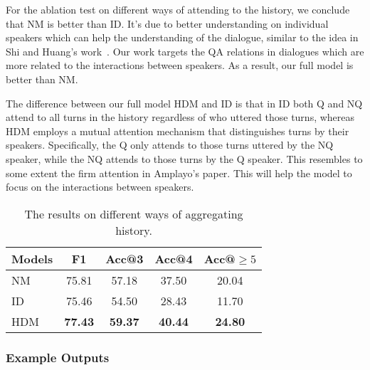 For the ablation test on different ways of attending to the history, we conclude that
NM is better than ID. It's due to better understanding on individual speakers which can
help the understanding of the dialogue, similar to the idea in Shi and Huang's work~\cite{ShiH19}.
Our work targets the QA relations in dialogues which are more related to the interactions 
between speakers. As a result, our full model is better than NM. 

The difference between our full model HDM and ID is that in ID both Q and NQ attend to
all turns in the history regardless of who uttered those turns, whereas HDM employs a
mutual attention mechanism that distinguishes turns by their speakers. Specifically, the
Q only attends to those turns uttered by the NQ speaker, while the NQ attends to those
turns by the Q speaker. This resembles to some extent the firm attention in Amplayo's paper\cite{amplayo2018entity}.
This will help the model to focus on the interactions between speakers. 



\begin{table}

	\centering
	\begin{tabular}{p{1.5cm}<{\centering}|c|ccc}
	\toprule[1.3pt]
	Models &F1&Acc@3&Acc@4&Acc@$\geq5$\\
	\midrule[1pt]
	NM&75.81&57.18&37.50&20.04 \\	
	ID&75.46&54.50&28.43&11.70\\
	HDM&\textbf{77.43}&\textbf{59.37}&\textbf{40.44}&\textbf{24.80}\\
	\bottomrule[1.3pt]
\end{tabular}
	\vspace{-0.25cm}
	\caption{The results on different ways of aggregating history.}
	\label{tab:historyways}
\end{table}



\subsubsection{Example Outputs}


